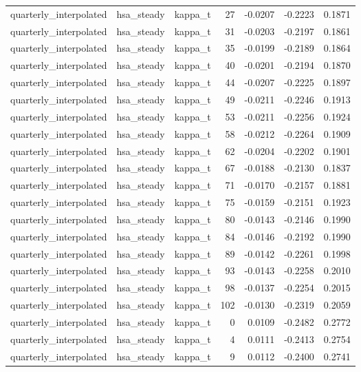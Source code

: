 \begin{tabular}{lllrrrr}
quarterly\_interpolated & hsa\_steady & kappa\_t & 27 & -0.0207 & -0.2223 & 0.1871 \\
quarterly\_interpolated & hsa\_steady & kappa\_t & 31 & -0.0203 & -0.2197 & 0.1861 \\
quarterly\_interpolated & hsa\_steady & kappa\_t & 35 & -0.0199 & -0.2189 & 0.1864 \\
quarterly\_interpolated & hsa\_steady & kappa\_t & 40 & -0.0201 & -0.2194 & 0.1870 \\
quarterly\_interpolated & hsa\_steady & kappa\_t & 44 & -0.0207 & -0.2225 & 0.1897 \\
quarterly\_interpolated & hsa\_steady & kappa\_t & 49 & -0.0211 & -0.2246 & 0.1913 \\
quarterly\_interpolated & hsa\_steady & kappa\_t & 53 & -0.0211 & -0.2256 & 0.1924 \\
quarterly\_interpolated & hsa\_steady & kappa\_t & 58 & -0.0212 & -0.2264 & 0.1909 \\
quarterly\_interpolated & hsa\_steady & kappa\_t & 62 & -0.0204 & -0.2202 & 0.1901 \\
quarterly\_interpolated & hsa\_steady & kappa\_t & 67 & -0.0188 & -0.2130 & 0.1837 \\
quarterly\_interpolated & hsa\_steady & kappa\_t & 71 & -0.0170 & -0.2157 & 0.1881 \\
quarterly\_interpolated & hsa\_steady & kappa\_t & 75 & -0.0159 & -0.2151 & 0.1923 \\
quarterly\_interpolated & hsa\_steady & kappa\_t & 80 & -0.0143 & -0.2146 & 0.1990 \\
quarterly\_interpolated & hsa\_steady & kappa\_t & 84 & -0.0146 & -0.2192 & 0.1990 \\
quarterly\_interpolated & hsa\_steady & kappa\_t & 89 & -0.0142 & -0.2261 & 0.1998 \\
quarterly\_interpolated & hsa\_steady & kappa\_t & 93 & -0.0143 & -0.2258 & 0.2010 \\
quarterly\_interpolated & hsa\_steady & kappa\_t & 98 & -0.0137 & -0.2254 & 0.2015 \\
quarterly\_interpolated & hsa\_steady & kappa\_t & 102 & -0.0130 & -0.2319 & 0.2059 \\
quarterly\_interpolated & hsa\_steady & kappa\_t & 0 & 0.0109 & -0.2482 & 0.2772 \\
quarterly\_interpolated & hsa\_steady & kappa\_t & 4 & 0.0111 & -0.2413 & 0.2754 \\
quarterly\_interpolated & hsa\_steady & kappa\_t & 9 & 0.0112 & -0.2400 & 0.2741 \\

\end{tabular}
